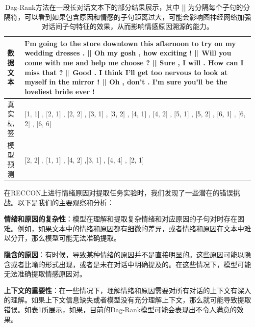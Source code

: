 \begin{table}[ht]
   \vspace{15pt}
	\renewcommand{\arraystretch}{1.2}
	\centering\wuhao
   \caption{Dag-Rank方法在一段长对话文本下的部分结果展示，其中 || 为分隔每个子句的分隔符，可以看到如果包含原因和情感的子句距离过大，可能会影响图神经网络加强对话间子句特征的效果，从而影响情感原因溯源的能力。}
   \label{tab:error}
   \vspace{6mm}
   \begin{tabularx}{\textwidth}{m{2cm}|p{12.8cm}}
   \toprule[1.5pt]
      
   \centering \textbf{数据文本}  & I'm going to the store downtown this afternoon to try on my wedding dresses . || Oh my gosh , how exciting ! || Will you come with me and help me choose ? || Sure , I will . How can I miss that ? || Good . I think I'll get too nervous to look at myself in the mirror ! || Oh , don't . I'm sure you'll be the loveliest bride ever !
   \\     \midrule[1pt]
   \centering 真实标签   &   [1, 1] , [2, 1] , [2, 2] , [3, 1] , [3, 2] , [4, 1] , [4, 2] , [5, 1] , [5, 2] , [6, 1] , [6, 2] , [6, 6]  \\  \midrule[1pt]
   \centering 模型预测   &   [2, 2] , [1, 1] , [4, 2] ,[3, 1] , [4, 4] , [2, 1]    \\     \bottomrule
   \end{tabularx}
   \vspace{10pt}
\end{table}


在RECCON上进行情绪原因对提取任务实验时，我们发现了一些潜在的错误挑战。以下是我们的主要观察和分析：

    \textbf{情绪和原因的复杂性}：模型在理解和提取复杂情绪和对应原因的子句对时存在困难。例如，如果文本中的情绪和原因都有细微的差异，或者情绪和原因在文本中难以分开，那么模型可能无法准确提取。

    \textbf{隐含的原因}：有时候，导致某种情绪的原因并不是直接明显的。这些原因可能以隐含或者比喻的形式出现，或者是未在对话中明确提及的。在这些情况下，模型可能无法准确提取情感原因对。

    \textbf{上下文的重要性}：在一些情况下，理解情绪和原因需要对所有对话的上下文有深入的理解。如果上下文信息缺失或者模型没有充分理解上下文，那么就可能导致提取错误。如表\ref{tab:error}所展示，如果，目前的Dag-Rank模型可能会表现出不令人满意的效果。

